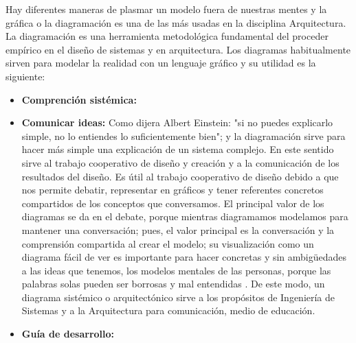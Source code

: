 Hay diferentes maneras de plasmar un modelo fuera de nuestras mentes y la gráfica o la diagramación es una de las más usadas en la disciplina Arquitectura. La diagramación es una herramienta metodológica fundamental del proceder empírico en el diseño de sistemas y en arquitectura. Los diagramas habitualmente sirven para modelar la realidad con un lenguaje gráfico y su utilidad es la siguiente:

\begin{itemize}
\item \textbf{Comprención sistémica:} 

\item \textbf{Comunicar ideas:} Como dijera Albert Einstein: "si no puedes explicarlo simple, no lo entiendes lo suficientemente bien"; y la diagramación sirve para hacer más simple una explicación de un sistema complejo. En este sentido sirve al trabajo cooperativo de diseño y creación y a la comunicación de los resultados del diseño. Es útil al trabajo cooperativo de diseño debido a que nos permite debatir, representar en gráficos y tener referentes concretos compartidos de los conceptos que conversamos. El principal valor de los diagramas se da en el debate, porque mientras diagramamos modelamos para mantener una conversación; pues, el valor principal es la conversación y la comprensión compartida al crear el modelo; su visualización como un diagrama fácil de ver es importante para hacer concretas y sin ambigüedades a las ideas que tenemos, los modelos mentales de las personas, porque las palabras solas pueden ser borrosas y mal entendidas \cite{Larman-Vodde-2008}. De este modo, un diagrama sistémico o arquitectónico sirve a los propósitos de Ingeniería de Sistemas y a la Arquitectura para comunicación, medio de educación.
 
\item \textbf{Guía de desarrollo:}

\end{itemize}

